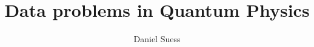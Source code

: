 \documentclass[a4paper,11pt,BCOR=8mm,twoside,headsepline]{scrbook}
\author{Daniel Suess}
\title{Data problems in Quantum Physics}
\begin{document}
\frontmatter
\maketitle
\tableofcontents
\newpage
\makeatletter
\providecommand\@dotsep{5}
\makeatother
\listoftodos\relax
\newpage



\mainmatter






\appendix

\printbibliography
\end{document}
